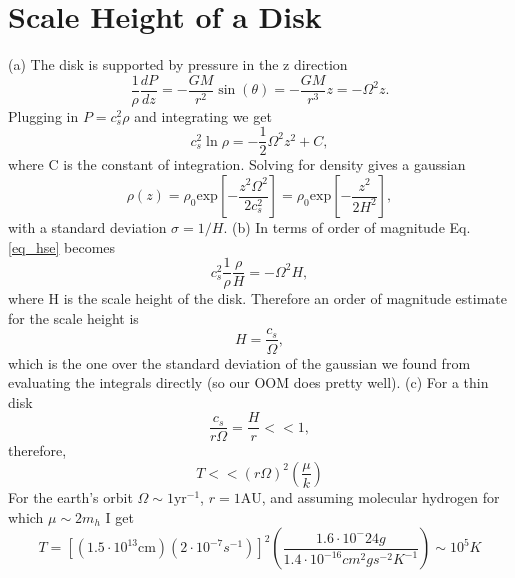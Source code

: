 \documentclass[11pt]{article}
\begin{document}
\section{Scale Height of a Disk}
\label{sec:org6806e30}
(a) The disk is supported by pressure in the z direction
\begin{equation}\label{eq_hse}
 \frac{1}{\rho} \frac{dP}{dz} = -\frac{G M}{r^2} \sin (\theta) = -\frac{G M}{r^3} z = - \Omega^2 z.
\end{equation}
Plugging in \(P = c_s^2 \rho\) and integrating we get
\begin{equation}
 c_s^2 \ln \rho = - \frac{1}{2} \Omega^2 z^2 + C,
\end{equation}
where C is the constant of integration.
Solving for density gives a gaussian
\begin{equation}
 \rho(z) = \rho_0 \text{exp} \left[- \frac{z^2 \Omega^2}{2 c_s^2}   \right] =  \rho_0 \text{exp} \left[- \frac{z^2}{2 H^2}   \right],
\end{equation}
with a standard deviation \(\sigma = 1/H\).
(b) In terms of order of magnitude Eq. \ref{eq_hse} becomes
\begin{equation}
 c_s^2 \frac{1}{\rho} \frac{\rho}{H} = - \Omega^2 H,
\end{equation}
where H is the scale height of the disk.
Therefore an order of magnitude estimate for the scale height is
\begin{equation}
 H = \frac{c_s}{\Omega},
\end{equation}
which is the one over the standard deviation of the gaussian we found from evaluating the integrals directly (so our OOM does pretty well).
\newline (c) For a thin disk
\begin{equation}
  \frac{c_s}{r \Omega} = \frac{H}{r} << 1,
\end{equation}
therefore,
\begin{equation}
  T << (r \Omega)^2 \left( \frac{\mu}{k} \right)
\end{equation}
For the earth's orbit \(\Omega \sim 1\text{yr}^{-1}\), \(r=1\text{AU}\), and assuming molecular hydrogen for which \(\mu \sim 2 m_h\) I get
\begin{equation}
 T = \left[ (1.5 \cdot 10^{13} \text{cm}) (2 \cdot 10^{-7} s^{-1}) \right]^2 \left( \frac{1.6 \cdot 10^-24 g}{1.4 \cdot 10^{-16} cm^2 g s^{-2} K^{-1}} \right)  \sim 10^5 K
\end{equation}
\end{document}
